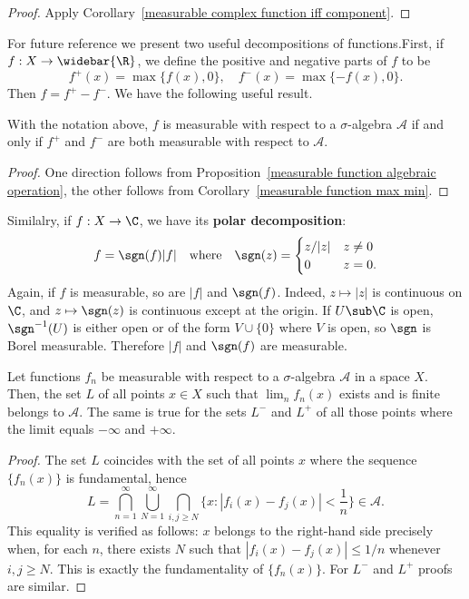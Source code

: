 \begin{proof}
Apply Corollary~\ref{measurable complex function iff component}.
\end{proof}
For future reference we present two useful decompositions of functions.First, if $f:X\to\widebar{\R}$, we define the positive and negative parts of $f$ to be
\[f^+(x)=\max\{f(x),0\},\quad f^-(x)=\max\{-f(x),0\}.\]
Then $f=f^+-f^-$. We have the following useful result.
\begin{proposition}\label{measurable iff positive negative part}
With the notation above, $f$ is measurable with respect to a $\sigma$-algebra $\mathcal{A}$ if and only if $f^+$ and $f^-$ are both measurable with respect to $\mathcal{A}$.
\end{proposition}
\begin{proof}
One direction follows from Proposition~\ref{measurable function algebraic operation}, the other follows from Corollary~\ref{measurable function max min}.
\end{proof}
Similalry, if $f:X\to\C$, we have its \textbf{polar decomposition}:
\[f=\sgn(f)|f|\quad\text{where}\quad \sgn(z)=\begin{cases}
z/|z|&z\neq 0\\
0&z=0.
\end{cases}\]
Again, if $f$ is measurable, so are $|f|$ and $\sgn(f)$. Indeed, $z\mapsto|z|$ is continuous on $\C$, and $z\mapsto\sgn(z)$ is continuous except at the origin. If $U\sub\C$ is open, $\sgn^{-1}(U)$ is either open or of the form $V\cup\{0\}$ where $V$ is open, so $\sgn$ is Borel measurable. Therefore $|f|$ and $\sgn(f)$ are measurable.
\begin{proposition}
Let functions $f_n$ be measurable with respect to a $\sigma$-algebra $\mathcal{A}$ in a space $X$. Then, the set $L$ of all points $x\in X$ such that $\lim_nf_n(x)$ exists and is finite belongs to $\mathcal{A}$. The same is true for the sets $L^-$ and $L^+$ of all those points where the limit equals $-\infty$ and $+\infty$.
\end{proposition}
\begin{proof}
The set $L$ coincides with the set of all points $x$ where the sequence $\{f_n(x)\}$ is fundamental, hence
\[L=\bigcap_{n=1}^{\infty}\bigcup_{N=1}^{\infty}\bigcap_{i,j\geq N}\{x:|f_i(x)-f_j(x)|<\frac{1}{n}\}\in\mathcal{A}.\]
This equality is verified as follows: $x$ belongs to the right-hand side precisely when, for each $n$, there exists $N$ such that $|f_i(x)-f_j(x)|\leq 1/n$ whenever $i,j\geq N$. This is exactly the fundamentality of $\{f_n(x)\}$. For $L^-$ and $L^+$ proofs are similar.
\end{proof}
